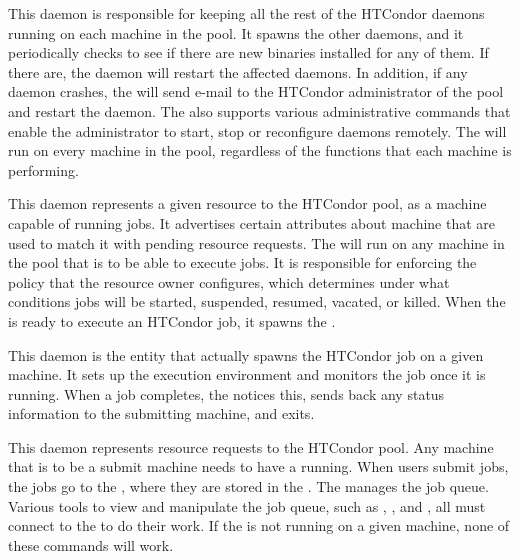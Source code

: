 \begin{description} 

\item[\Condor{master}] This daemon
is responsible for keeping all the
rest of the HTCondor daemons running on each machine in the pool.  It
spawns the other daemons, and it periodically checks to see if there are
new binaries installed for any of them.  If there are, the 
 daemon will
restart the affected daemons.  In addition, if any daemon crashes, the
 will send e-mail to the HTCondor administrator of the pool and
restart the daemon.  The  also supports various
administrative commands that enable the administrator to start, 
stop or reconfigure daemons remotely.  
The  will run on every machine in
the pool, regardless of the functions that each machine is performing.  

\item[\Condor{startd}] This daemon
represents a given resource to the HTCondor pool,  
as a machine capable of running jobs. 
It advertises certain attributes about machine that are used to
match it with pending resource requests.  
The  will run on any
machine in the pool that is to be able to execute jobs.  
It is responsible for enforcing the policy that the resource owner configures,
which determines under what conditions jobs will be started,
suspended, resumed, vacated, or killed.
When the  is ready to
execute an HTCondor job, it spawns the .

\item[\Condor{starter}] This daemon
is the entity that actually
spawns the HTCondor job on a given machine.  It sets up the
execution environment and monitors the job once it is running.  When a
job completes, the  notices this, sends back any status
information to the submitting machine, and exits.

\item[\Condor{schedd}] This daemon
represents resource requests to
the HTCondor pool.  Any machine that is to be a submit machine
needs to have a  running.  
When users submit jobs, 
the jobs go to the , where they are stored in the 
.
The  manages the job queue.
Various tools to view and
manipulate the job queue,
such as , , and ,
all must connect to the  to do their work.  If the
 is not running on a given machine, 
none of these commands will work.  


\end{description}
